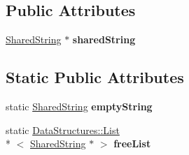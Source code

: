 \subsection*{Public Attributes}
\begin{DoxyCompactItemize}
\item 
\hypertarget{class_rak_net_1_1_rak_string_a17c8b8a75cbbb717b31bdc9ff5017dff}{\hyperlink{struct_rak_net_1_1_rak_string_1_1_shared_string}{Shared\-String} $\ast$ {\bfseries shared\-String}}\label{class_rak_net_1_1_rak_string_a17c8b8a75cbbb717b31bdc9ff5017dff}

\end{DoxyCompactItemize}
\subsection*{Static Public Attributes}
\begin{DoxyCompactItemize}
\item 
\hypertarget{class_rak_net_1_1_rak_string_a8d32cb109dcb5afe78ccd6185d5ff02d}{static \hyperlink{struct_rak_net_1_1_rak_string_1_1_shared_string}{Shared\-String} {\bfseries empty\-String}}\label{class_rak_net_1_1_rak_string_a8d32cb109dcb5afe78ccd6185d5ff02d}

\item 
\hypertarget{class_rak_net_1_1_rak_string_a138e8e0e017222743aa3afba19ae07e9}{static \hyperlink{class_data_structures_1_1_list}{Data\-Structures\-::\-List}\\*
$<$ \hyperlink{struct_rak_net_1_1_rak_string_1_1_shared_string}{Shared\-String} $\ast$ $>$ {\bfseries free\-List}}\label{class_rak_net_1_1_rak_string_a138e8e0e017222743aa3afba19ae07e9}

\end{DoxyCompactItemize}
